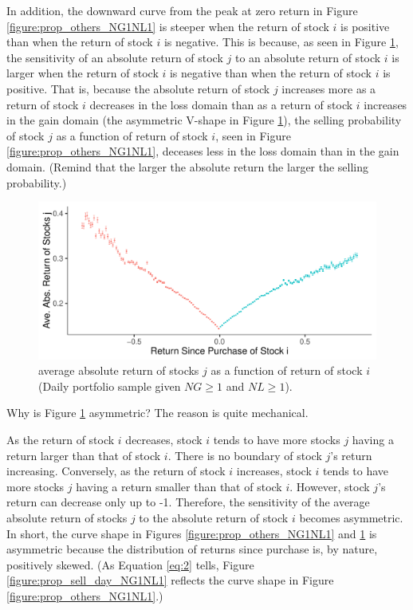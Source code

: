 \documentclass[11pt, a4paper]{article}
\begin{document}
In addition, the downward curve from the peak at zero return in Figure \ref{figure:prop_others_NG1NL1} is steeper when the return of stock $i$ is positive than when the return of stock $i$ is negative. This is because, as seen in Figure \ref{figure:ret_i_abs_j_NG1NL1}, the sensitivity of an absolute return of stock $j$ to an absolute return of stock $i$ is larger when the return of stock $i$ is negative than when the return of stock $i$ is positive. 
That is, because the absolute return of stock $j$ increases more as a return of stock $i$ decreases in the loss domain than as a return of stock $i$ increases in the gain domain (the asymmetric V-shape in Figure \ref{figure:ret_i_abs_j_NG1NL1}), the selling probability of stock $j$ as a function of return of stock $i$, seen in Figure \ref{figure:prop_others_NG1NL1}, deceases less in the loss domain than in the gain domain.
(Remind that the larger the absolute return the larger the selling probability.)  


\begin{figure}[H]
	\centering
	\includegraphics[width=0.8\columnwidth]{barc_R_i_abs_R_j_NG1_NL1.pdf}
	\caption{average absolute return of stocks $j$ as a function of return of stock $i$ (Daily portfolio sample given $NG\geq1$ and $NL\geq1$).}
	\label{figure:ret_i_abs_j_NG1NL1}
\end{figure}


Why is Figure \ref{figure:ret_i_abs_j_NG1NL1} asymmetric? The reason is quite mechanical.

As the return of stock $i$ decreases, stock $i$ tends to have more stocks $j$ having a return larger than that of stock $i$. There is no boundary of stock $j$'s return increasing. Conversely, as the return of stock $i$ increases, stock $i$ tends to have more stocks $j$ having a return smaller than that of stock $i$. However,  stock $j$'s return can decrease only up to -1. Therefore, the sensitivity of the average absolute return of stocks $j$ to the absolute return of stock $i$ becomes asymmetric. 
In short, the curve shape in Figures \ref{figure:prop_others_NG1NL1} and \ref{figure:ret_i_abs_j_NG1NL1} is asymmetric because the distribution of returns since purchase is, by nature, positively skewed. (As Equation \ref{eq:2} tells, Figure \ref{figure:prop_sell_day_NG1NL1} reflects the curve shape in Figure \ref{figure:prop_others_NG1NL1}.)
\end{document}
